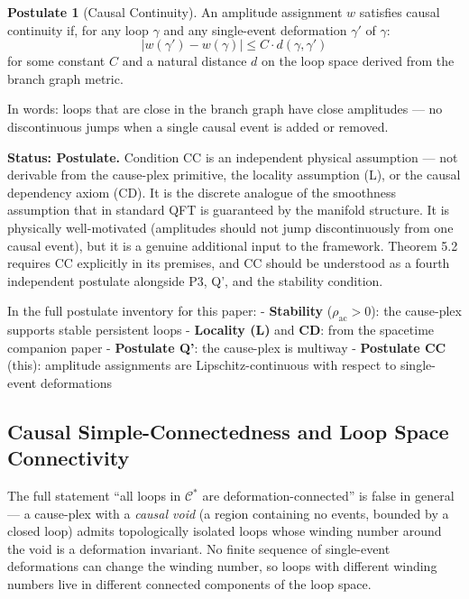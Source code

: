 \documentclass[11pt]{article}
\theoremstyle{definition}
\newtheorem{assumption}[theorem]{Postulate}
\theoremstyle{remark}
\begin{document}
\begin{assumption}[Causal Continuity]
An amplitude assignment $w$ satisfies causal continuity if, for any loop $\gamma$ and any single-event deformation $\gamma'$ of $\gamma$:
$$|w(\gamma') - w(\gamma)| \leq C \cdot d(\gamma, \gamma')$$
for some constant $C$ and a natural distance $d$ on the loop space derived from the branch graph metric.
\end{assumption}

In words: loops that are close in the branch graph have close amplitudes
--- no discontinuous jumps when a single causal event is added or
removed.

\textbf{Status: Postulate.} Condition CC is an independent physical
assumption --- not derivable from the cause-plex primitive, the locality
assumption (L), or the causal dependency axiom (CD). It is the discrete
analogue of the smoothness assumption that in standard QFT is guaranteed
by the manifold structure. It is physically well-motivated (amplitudes
should not jump discontinuously from one causal event), but it is a
genuine additional input to the framework. Theorem 5.2 requires CC
explicitly in its premises, and CC should be understood as a fourth
independent postulate alongside P3, Q', and the stability condition.

In the full postulate inventory for this paper: - \textbf{Stability}
(\(\rho_{\mathrm{ac}} > 0\)): the cause-plex supports stable persistent
loops - \textbf{Locality (L)} and \textbf{CD}: from the spacetime
companion paper - \textbf{Postulate Q'}: the cause-plex is multiway -
\textbf{Postulate CC} (this): amplitude assignments are
Lipschitz-continuous with respect to single-event deformations

\subsection{Causal Simple-Connectedness and Loop Space
Connectivity}\label{causal-simple-connectedness-and-loop-space-connectivity}

The full statement ``all loops in \(\mathcal{C}^{\ast}\) are
deformation-connected'' is false in general --- a cause-plex with a
\emph{causal void} (a region containing no events, bounded by a closed
loop) admits topologically isolated loops whose winding number around
the void is a deformation invariant. No finite sequence of single-event
deformations can change the winding number, so loops with different
winding numbers live in different connected components of the loop
space.
\end{document}
